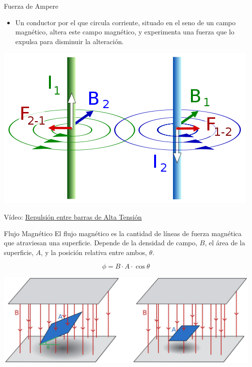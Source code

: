 \documentclass[xcolor={usenames,svgnames,dvipsnames}]{beamer}
\begin{document}
\begin{frame}[label={sec:org4cc61ff}]{Fuerza de Ampere}
\begin{itemize}
\item Un conductor por el que circula corriente, situado en el seno de un
campo magnético, altera este campo magnético, y experimenta una
fuerza que lo expulsa para disminuir la alteración.
\end{itemize}

\begin{center}
\includegraphics[width=.9\linewidth]{../figs/FuerzasRepulsion.png}
\end{center}

\begin{center}
Vídeo: \href{http://www.youtube.com/watch?v=2j8D\_N1v0tU}{Repulsión entre barras de Alta Tensión}
\end{center}
\end{frame}

\begin{frame}[label={sec:orgb3be910}]{Flujo Magnético}
El flujo magnético es la cantidad de líneas de fuerza magnética que atraviesan una superficie. Depende de la densidad de campo, \(B\), el área de la superficie, \(A\), y la posición relativa entre ambos, \(\theta\).

\[
\phi = B \cdot A \cdot \cos \theta
\]

\begin{center}
\includegraphics[width=.9\linewidth]{../figs/flujo_magnetico.pdf}
\end{center}
\end{frame}
\end{document}
